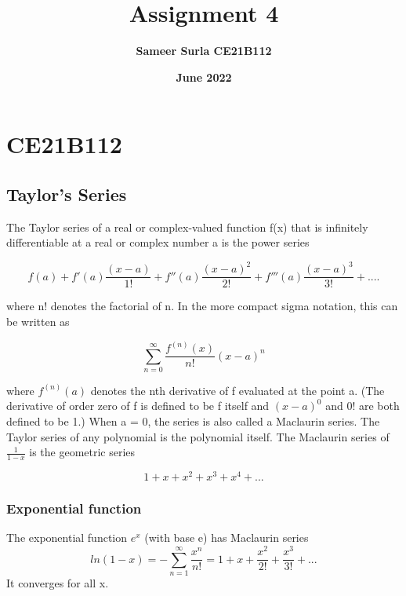 \section{CE21B112}

\title{\textbf{Assignment 4}}
\author{\textbf{Sameer Surla CE21B112}}
\date{\textbf{June 2022}}

\maketitle
\subsection{Taylor's Series}

The Taylor series of a real or complex-valued function f(x) that is infinitely differentiable at a real or complex number a is the power series

\begin{equation}
f(a) + f'(a)\frac{(x-a)}{1!} + f''(a)\frac{(x-a)^2}{2!} + f'''(a)\frac{(x-a)^3}{3!} + ....
\end{equation} 

where n! denotes the factorial of n. In the more compact sigma notation, this can be written as

\begin{equation}
    \sum_{n=0}^{\infty} \frac{f^{(n)} (x)}{n!} (x-a)^n
\end{equation}

where $f^{(n)}(a)$ denotes the nth derivative of f evaluated at the point a. (The derivative of order zero of f is defined to be f itself and $(x−a)^0$ and $0!$ are both defined to be 1.)
\newline
\newline
When a = 0, the series is also called a Maclaurin series.
The Taylor series of any polynomial is the polynomial itself.
\newline
The Maclaurin series of 
$\frac{1}{1-x}$
 is the geometric series

\begin{equation}
    1+x+x^2+x^3+x^4+...
\end{equation}

\subsubsection{Exponential function}

The exponential function ${ e^{x}}$ (with base e) has Maclaurin series
\begin{equation}
  ln(1-x) = -\sum_{n=1}^{\infty} \frac{x^{n}}{n!} = 1+x+ \frac{x^2}{2!}+ \frac{x^3}{3!}+...
\end{equation}
It converges for all x.
\newline

